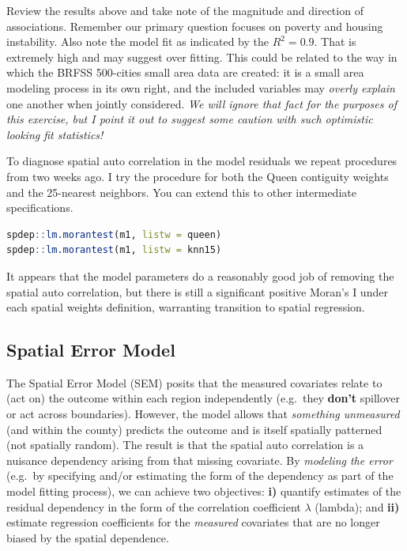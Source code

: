 \documentclass[
]{book}
\begin{document}
Review the results above and take note of the magnitude and direction of associations. Remember our primary question focuses on poverty and housing instability. Also note the model fit as indicated by the \(R^2=0.9\). That is extremely high and may suggest over fitting. This could be related to the way in which the BRFSS 500-cities small area data are created: it is a small area modeling process in its own right, and the included variables may \emph{overly explain} one another when jointly considered. \emph{We will ignore that fact for the purposes of this exercise, but I point it out to suggest some caution with such optimistic looking fit statistics!}

To diagnose spatial auto correlation in the model residuals we repeat procedures from two weeks ago. I try the procedure for both the Queen contiguity weights and the 25-nearest neighbors. You can extend this to other intermediate specifications.

\begin{lstlisting}[language=R]
spdep::lm.morantest(m1, listw = queen)
spdep::lm.morantest(m1, listw = knn15)
\end{lstlisting}

It appears that the model parameters do a reasonably good job of removing the spatial auto correlation, but there is still a significant positive Moran's I under each spatial weights definition, warranting transition to spatial regression.

\hypertarget{spatial-error-model-1}{%
\subsection{Spatial Error Model}\label{spatial-error-model-1}}

The Spatial Error Model (SEM) posits that the measured covariates relate to (act on) the outcome within each region independently (e.g.~they \textbf{don't} spillover or act across boundaries). However, the model allows that \emph{something unmeasured} (and within the county) predicts the outcome and is itself spatially patterned (not spatially random). The result is that the spatial auto correlation is a nuisance dependency arising from that missing covariate. By \emph{modeling the error} (e.g.~by specifying and/or estimating the form of the dependency as part of the model fitting process), we can achieve two objectives: \textbf{i)} quantify estimates of the residual dependency in the form of the correlation coefficient \(\lambda\) (lambda); and \textbf{ii)} estimate regression coefficients for the \emph{measured} covariates that are no longer biased by the spatial dependence.
\end{document}
